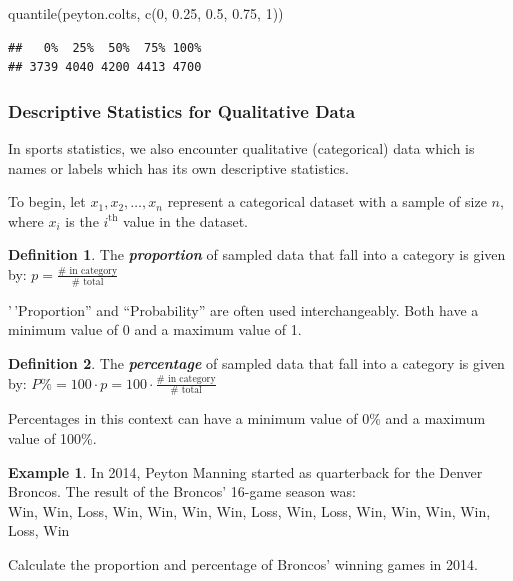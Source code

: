 \documentclass[
  11pt,
]{book}
\newenvironment{Shaded}{\begin{snugshade}}{\end{snugshade}}
\newcommand{\DecValTok}[1]{\textcolor[rgb]{0.00,0.00,0.81}{#1}}
\newcommand{\FloatTok}[1]{\textcolor[rgb]{0.00,0.00,0.81}{#1}}
\newcommand{\FunctionTok}[1]{\textcolor[rgb]{0.00,0.00,0.00}{#1}}
\newcommand{\NormalTok}[1]{#1}
\theoremstyle{definition}
\newtheorem{definition}{Definition}[chapter]
\theoremstyle{definition}
\newtheorem{example}{Example}[chapter]
\theoremstyle{definition}
\theoremstyle{definition}
\theoremstyle{remark}
\begin{document}
\begin{Shaded}
\begin{Highlighting}[]
\FunctionTok{quantile}\NormalTok{(peyton.colts, }\FunctionTok{c}\NormalTok{(}\DecValTok{0}\NormalTok{, }\FloatTok{0.25}\NormalTok{, }\FloatTok{0.5}\NormalTok{, }\FloatTok{0.75}\NormalTok{, }\DecValTok{1}\NormalTok{))}
\end{Highlighting}
\end{Shaded}

\begin{verbatim}
##   0%  25%  50%  75% 100% 
## 3739 4040 4200 4413 4700
\end{verbatim}

\hypertarget{descriptive-statistics-for-qualitative-data}{%
\subsubsection{Descriptive Statistics for Qualitative Data}\label{descriptive-statistics-for-qualitative-data}}

In sports statistics, we also encounter qualitative (categorical) data which is names or labels which has its own descriptive statistics.

To begin, let \(x_1, x_2, \ldots, x_n\) represent a categorical dataset with a sample of size \(n\), where \(x_i\) is the \(i^\text{th}\) value in the dataset.

\begin{definition}
The \textbf{\emph{proportion}} of sampled data that fall into a category is given by: \(p = \frac{\#\text{ in category}}{\#\text{ total}}\)
\end{definition}

'\,'Proportion'' and ``Probability'' are often used interchangeably. Both have a minimum value of 0 and a maximum value of 1.

\begin{definition}
The \textbf{\emph{percentage}} of sampled data that fall into a category is given by: \(P\% = 100 \cdot p = 100 \cdot \frac{\#\text{ in category}}{\#\text{ total}}\)
\end{definition}

Percentages in this context can have a minimum value of 0\% and a maximum value of 100\%.

\begin{example}
In 2014, Peyton Manning started as quarterback for the Denver Broncos. The result of the Broncos' 16-game season was:\\
Win, Win, Loss, Win, Win, Win, Win, Loss, Win, Loss, Win, Win, Win, Win, Loss, Win

Calculate the proportion and percentage of Broncos' winning games in 2014.
\end{example}
\end{document}
